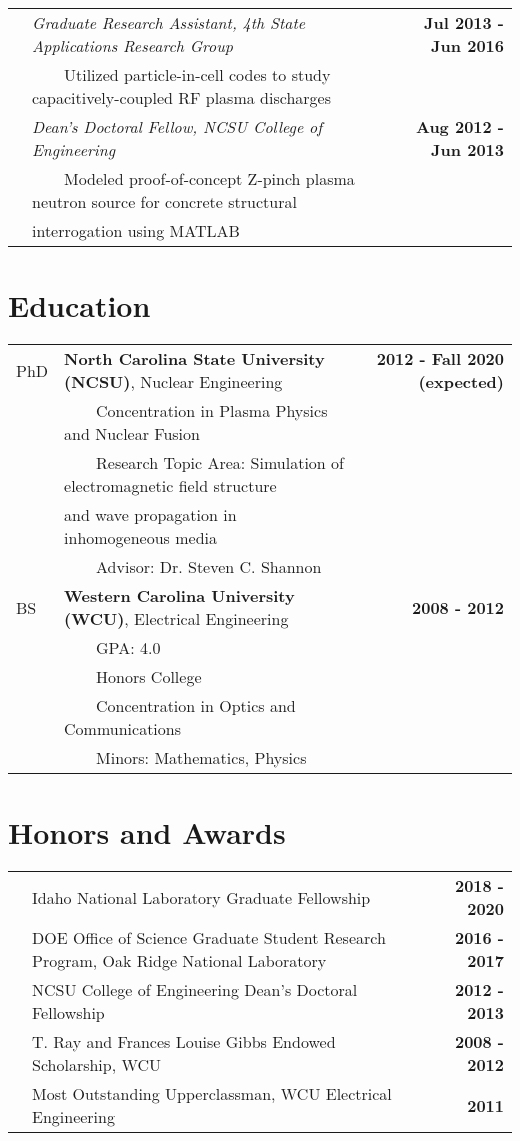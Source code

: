 \documentclass{article}
\newcommand{\tabitem}{~~\textbullet~~}
\begin{document}
\begin{tabularx}{\textwidth}{l X r}
	& \textit{Graduate Research Assistant, 4th State Applications Research Group} & \textbf{Jul 2013 - Jun 2016} \\
	& \tabitem Utilized particle-in-cell codes to study capacitively-coupled RF plasma discharges & \\
	& \textit{Dean's Doctoral Fellow, NCSU College of Engineering} & \textbf{Aug 2012 - Jun 2013} \\
	& \tabitem Modeled proof-of-concept Z-pinch plasma neutron source for concrete structural & \\
	& \hspace{1.5em} interrogation using MATLAB & \\
\end{tabularx}

\section*{Education}

	\begin{tabularx}{\textwidth}{l X r}
	PhD 		 & \textbf{North Carolina State University (NCSU)}, Nuclear Engineering &  \textbf{2012 - Fall 2020 (expected)} \\
				 & \tabitem Concentration in Plasma Physics and Nuclear Fusion & \\
				 & \tabitem Research Topic Area: Simulation of electromagnetic field structure & \\
				 & \hspace{1.5em} and wave propagation in inhomogeneous media & \\
				 & \tabitem Advisor: Dr. Steven C. Shannon & \\
	BS			 & \textbf{Western Carolina University (WCU)}, Electrical Engineering  & \textbf{2008 - 2012} \\
				 & \tabitem GPA: 4.0 & \\
				 & \tabitem Honors College & \\
				 & \tabitem Concentration in Optics and Communications & \\
				 & \tabitem Minors: Mathematics, Physics &
	\end{tabularx}

\section*{Honors and Awards}

	\begin{tabularx}{\textwidth}{l X r}
		\hspace{2em} & Idaho National Laboratory Graduate Fellowship & \textbf{2018 - 2020} \\
					 & DOE Office of Science Graduate Student Research Program, Oak Ridge National Laboratory & \textbf{2016 - 2017} \\
					 & NCSU College of Engineering Dean's Doctoral Fellowship & \textbf{2012 - 2013} \\
					 & T. Ray and Frances Louise Gibbs Endowed Scholarship, WCU & \textbf{2008 - 2012} \\
					 & Most Outstanding Upperclassman, WCU Electrical Engineering & \textbf{2011}
	\end{tabularx}
\end{document}
